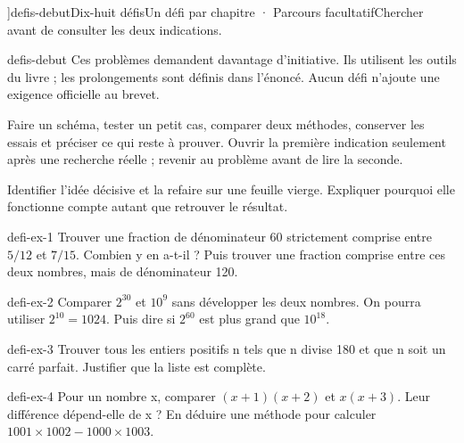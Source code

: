 \editionPage[\pdfbookmark[0]{Défis d’approfondissement}{bm-defis-debut-parent}]{defis-debut}{Dix-huit défis}{Un défi par chapitre · Parcours facultatif}{Chercher avant de consulter les deux indications.}
\begin{blocEdition}{defis-debut}
Ces problèmes demandent davantage d’initiative. Ils utilisent les outils du livre ; les prolongements sont définis dans l’énoncé. Aucun défi n’ajoute une exigence officielle au brevet.\par\bigskip
\begin{savoirfaire}Faire un schéma, tester un petit cas, comparer deux méthodes, conserver les essais et préciser ce qui reste à prouver. Ouvrir la première indication seulement après une recherche réelle ; revenir au problème avant de lire la seconde.\end{savoirfaire}
\begin{savoirfaire}Identifier l’idée décisive et la refaire sur une feuille vierge. Expliquer pourquoi elle fonctionne compte autant que retrouver le résultat.\end{savoirfaire}
\end{blocEdition}
\begin{blocEdition}{defi-ex-1}
Trouver une fraction de dénominateur 60 strictement comprise entre $5/12$ et $7/15$. Combien y en a-t-il ? Puis trouver une fraction comprise entre ces deux nombres, mais de dénominateur 120.
\end{blocEdition}
\begin{blocEdition}{defi-ex-2}
Comparer $2^{30}$ et $10^9$ sans développer les deux nombres. On pourra utiliser $2^{10}=1024$. Puis dire si $2^{60}$ est plus grand que $10^{18}$.
\end{blocEdition}
\begin{blocEdition}{defi-ex-3}
Trouver tous les entiers positifs n tels que n divise 180 et que n soit un carré parfait. Justifier que la liste est complète.
\end{blocEdition}
\begin{blocEdition}{defi-ex-4}
Pour un nombre x, comparer $(x+1)(x+2)$ et $x(x+3)$. Leur différence dépend-elle de x ? En déduire une méthode pour calculer $1001\times1002-1000\times1003$.
\end{blocEdition}
